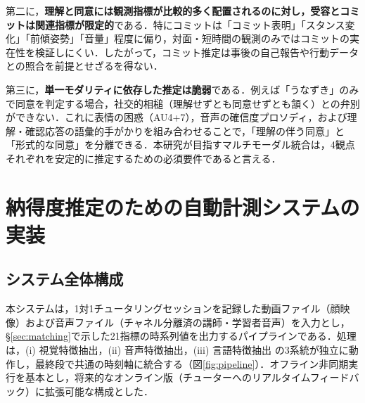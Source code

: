 \documentclass[Japanese]{dicomopapers}
\begin{document}
第二に，\textbf{理解と同意には観測指標が比較的多く配置されるのに対し，受容とコミットは関連指標が限定的}である．特にコミットは「コミット表明」「スタンス変化」「前傾姿勢」「音量」程度に偏り，対面・短時間の観測のみではコミットの実在性を検証しにくい．したがって，コミット推定は事後の自己報告や行動データとの照合を前提とせざるを得ない．

第三に，\textbf{単一モダリティに依存した推定は脆弱}である．例えば「うなずき」のみで同意を判定する場合，社交的相槌（理解せずとも同意せずとも頷く）との弁別ができない．これに表情の困惑（AU4+7），音声の確信度プロソディ，および理解・確認応答の語彙的手がかりを組み合わせることで，「理解の伴う同意」と「形式的な同意」を分離できる．本研究が目指すマルチモーダル統合は，4観点それぞれを安定的に推定するための必須要件であると言える．

\section{納得度推定のための自動計測システムの実装}

\subsection{システム全体構成}

本システムは，1対1チュータリングセッションを記録した動画ファイル（顔映像）および音声ファイル（チャネル分離済の講師・学習者音声）を入力とし，\S\ref{sec:matching}で示した21指標の時系列値を出力するパイプラインである．処理は，(i) 視覚特徴抽出，(ii) 音声特徴抽出，(iii) 言語特徴抽出 の3系統が独立に動作し，最終段で共通の時刻軸に統合する（図\ref{fig:pipeline}）．オフライン非同期実行を基本とし，将来的なオンライン版（チューターへのリアルタイムフィードバック）に拡張可能な構成とした．
\end{document}
